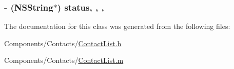 \hypertarget{interface_contact_list_ae5c6acb5c88634460a5cac1765e68586}{
\subsubsection[{status}]{\setlength{\rightskip}{0pt plus 5cm}-\/ (N\-S\-String$\ast$) status\hspace{0.3cm}{\ttfamily [read]}, {\ttfamily [write]}, {\ttfamily [nonatomic]}, {\ttfamily [strong]}}}\label{interface_contact_list_ae5c6acb5c88634460a5cac1765e68586}


The documentation for this class was generated from the following files\-:\begin{DoxyCompactItemize}
\item 
Components/\-Contacts/\hyperlink{_contact_list_8h}{Contact\-List.\-h}\item 
Components/\-Contacts/\hyperlink{_contact_list_8m}{Contact\-List.\-m}\end{DoxyCompactItemize}
